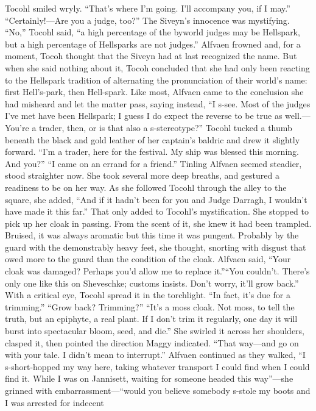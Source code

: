 \documentclass[9pt]{article}
\begin{document}
Tocohl smiled wryly. “That’s where I’m going. I’ll accompany you, if I may.”
“Certainly!—Are you a judge, too?”
The Siveyn’s innocence was mystifying. “No,” Tocohl said, “a high percentage of the byworld judges
may be Hellspark, but a high percentage of Hellsparks are not judges.”
Alfvaen frowned and, for a moment, Tocoh thought that the Siveyn had at last recognized the name.
But when she said nothing about it, Tocoh concluded that she had only been reacting to the Hellspark
tradition of alternating the pronunciation of their world’s name: first Hell’s-park, then Hell-spark.
Like most, Alfvaen came to the conclusion she had misheard and let the matter pass, saying instead,
“I s-see. Most of the judges I’ve met have been Hellspark; I guess I do expect the reverse to be true as
well.—You’re a trader, then, or is that also a s-stereotype?”
Tocohl tucked a thumb beneath the black and gold leather of her captain’s baldric and drew it slightly
forward. “I’m a trader, here for the festival. My ship was blessed this morning. And you?”
“I came on an errand for a friend.” Tinling Alfvaen seemed steadier, stood straighter now. She took
several more deep breaths, and gestured a readiness to be on her way. As she followed Tocohl through
the alley to the square, she added, “And if it hadn’t been for you and Judge Darragh, I wouldn’t have
made it this far.”
That only added to Tocohl’s mystification. She stopped to pick up her cloak in passing. From the
scent of it, she knew it had been trampled. Bruised, it was always aromatic but this time it was pungent.
Probably by the guard with the demonstrably heavy feet, she thought, snorting with disgust that owed
more to the guard than the condition of the cloak.
Alfvaen said, “Your cloak was damaged? Perhaps you’d allow me to replace it.”“You couldn’t. There’s only one like this on Sheveschke; customs insists. Don’t worry, it’ll grow
back.” With a critical eye, Tocohl spread it in the torchlight. “In fact, it’s due for a trimming.”
“Grow back? Trimming?”
“It’s a moss cloak. Not moss, to tell the truth, but an epiphyte, a real plant. If I don’t trim it regularly,
one day it will burst into spectacular bloom, seed, and die.” She swirled it across her shoulders, clasped
it, then pointed the direction Maggy indicated. “That way—and go on with your tale. I didn’t mean to
interrupt.”
Alfvaen continued as they walked, “I s-short-hopped my way here, taking whatever transport I could
find when I could find it. While I was on Jannisett, waiting for someone headed this way”—she grinned
with embarrassment—“would you believe somebody s-stole my boots and I was arrested for indecent
\end{document}
